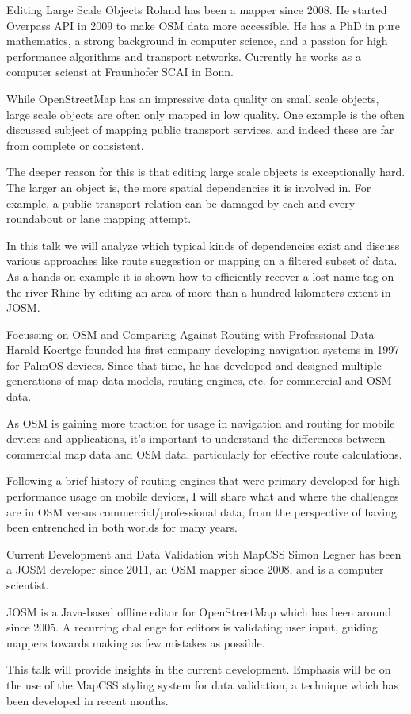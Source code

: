 %
{Editing Large Scale Objects}%
{Roland has been a mapper since 2008. He started Overpass API in 2009 to make OSM data more accessible. He has a PhD in pure mathematics, a strong background in computer science, and a passion for high performance algorithms and transport networks. Currently he works as a computer scienst at Fraunhofer SCAI in Bonn. }%
{While OpenStreetMap has an impressive data quality on small scale objects, large scale objects are often only mapped in low quality. One example is the often discussed subject of mapping public transport services, and indeed these are far from complete or consistent.

The deeper reason for this is that editing large scale objects is exceptionally hard. The larger an object is, the more spatial dependencies it is involved in. For example, a public transport relation can be damaged by each and every roundabout or lane mapping attempt.

In this talk we will analyze which typical kinds of dependencies exist and discuss various approaches like route suggestion or mapping on a filtered subset of data. As a hands-on example it is shown how to efficiently recover a lost name tag on the river Rhine by editing an area of more than a hundred kilometers extent in JOSM.}

%
{Focussing on OSM and Comparing Against Routing with Professional Data}%
{Harald Koertge founded his first company developing navigation systems in 1997 for PalmOS devices. Since that time, he has developed and designed multiple generations of map data models, routing engines, etc. for commercial and OSM data.}%
{As OSM is gaining more traction for usage in navigation and routing for mobile devices and applications, it’s important to understand the differences between commercial map data and OSM data, particularly for effective route calculations. 

Following a brief history of routing engines that were primary developed for high performance usage on mobile devices, I will share what and where the challenges are in OSM versus commercial/professional data, from the perspective of having been entrenched in both worlds for many years.}

%
{Current Development and Data Validation with MapCSS}%
{Simon Legner has been a JOSM developer since 2011, an OSM mapper since 2008, and is a computer scientist.}%
{JOSM is a Java-based offline editor for OpenStreetMap which has been around since 2005. A recurring challenge for editors is validating user input, guiding mappers towards making as few mistakes as possible.

This talk will provide insights in the current development. Emphasis will be on the use of the MapCSS styling system for data validation, a technique which has been developed in recent months.}

